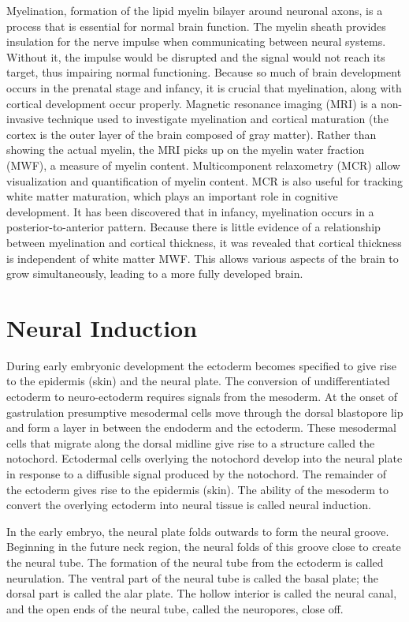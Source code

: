 Myelination, formation of the lipid myelin bilayer around neuronal axons, is a process that is essential for normal brain function. The myelin sheath provides insulation for the nerve impulse when communicating between neural systems. Without it, the impulse would be disrupted and the signal would not reach its target, thus impairing normal functioning. Because so much of brain development occurs in the prenatal stage and infancy, it is crucial that myelination, along with cortical development occur properly. Magnetic resonance imaging (MRI) is a non-invasive technique used to investigate myelination and cortical maturation (the cortex is the outer layer of the brain composed of gray matter). Rather than showing the actual myelin, the MRI picks up on the myelin water fraction (MWF), a measure of myelin content. Multicomponent relaxometry (MCR) allow visualization and quantification of myelin content. MCR is also useful for tracking white matter maturation, which plays an important role in cognitive development. It has been discovered that in infancy, myelination occurs in a posterior-to-anterior pattern. Because there is little evidence of a relationship between myelination and cortical thickness, it was revealed that cortical thickness is independent of white matter MWF. This allows various aspects of the brain to grow simultaneously, leading to a more fully developed brain.

\hypertarget{neural-induction}{%
\section{Neural Induction}\label{neural-induction}}

During early embryonic development the ectoderm becomes specified to give rise to the epidermis (skin) and the neural plate. The conversion of undifferentiated ectoderm to neuro-ectoderm requires signals from the mesoderm. At the onset of gastrulation presumptive mesodermal cells move through the dorsal blastopore lip and form a layer in between the endoderm and the ectoderm. These mesodermal cells that migrate along the dorsal midline give rise to a structure called the notochord. Ectodermal cells overlying the notochord develop into the neural plate in response to a diffusible signal produced by the notochord. The remainder of the ectoderm gives rise to the epidermis (skin). The ability of the mesoderm to convert the overlying ectoderm into neural tissue is called neural induction.

In the early embryo, the neural plate folds outwards to form the neural groove. Beginning in the future neck region, the neural folds of this groove close to create the neural tube. The formation of the neural tube from the ectoderm is called neurulation. The ventral part of the neural tube is called the basal plate; the dorsal part is called the alar plate. The hollow interior is called the neural canal, and the open ends of the neural tube, called the neuropores, close off.

